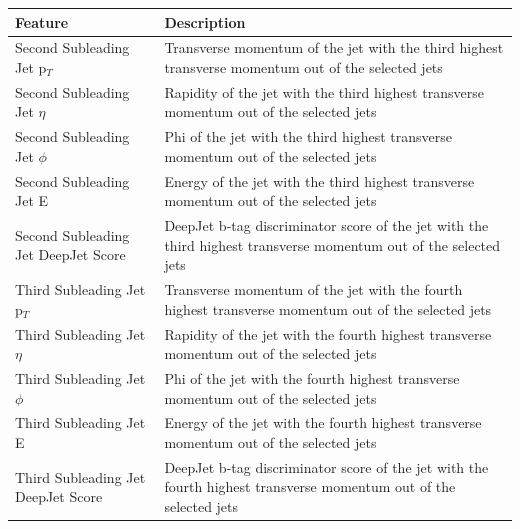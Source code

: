 \begin{table}[!htbp]
\centering
{
\begin{tabular}{|p{4cm}|p{12cm}|}
\hline
Feature & Description \\
\hline
Second Subleading Jet p$_T$ & Transverse momentum of the jet with the third highest transverse momentum out of the selected jets \\
Second Subleading Jet $\eta$ & Rapidity of the jet with the third highest transverse momentum out of the selected jets \\
Second Subleading Jet $\phi$ & Phi of the jet with the third highest transverse momentum out of the selected jets \\
Second Subleading Jet E & Energy of the jet with the third highest transverse momentum out of the selected jets \\
Second Subleading Jet DeepJet Score & DeepJet b-tag discriminator score of the jet with the third highest transverse momentum out of the selected jets \\

Third Subleading Jet p$_T$ & Transverse momentum of the jet with the fourth highest transverse momentum out of the selected jets \\
Third Subleading Jet $\eta$ & Rapidity of the jet with the fourth highest transverse momentum out of the selected jets \\
Third Subleading Jet $\phi$ & Phi of the jet with the fourth highest transverse momentum out of the selected jets \\
Third Subleading Jet E & Energy of the jet with the fourth highest transverse momentum out of the selected jets \\
Third Subleading Jet DeepJet Score & DeepJet b-tag discriminator score of the jet with the fourth highest transverse momentum out of the selected jets \\


\end{tabular}}
\end{table}
